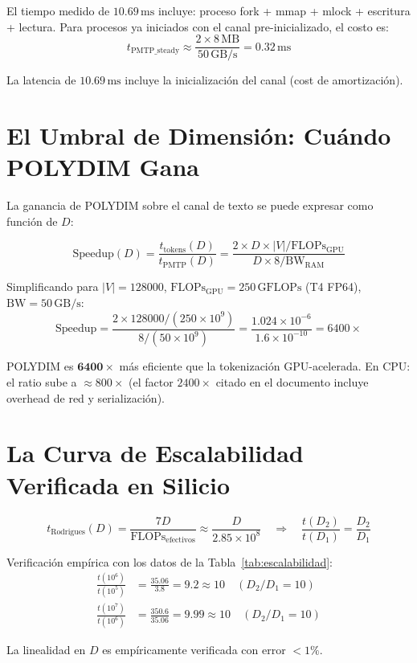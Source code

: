 El tiempo medido de $10.69\,\text{ms}$ incluye: proceso fork + mmap + mlock + escritura + lectura.
Para procesos ya iniciados con el canal pre-inicializado, el costo es:
\begin{equation}
t_{\text{PMTP\_steady}} \approx \frac{2 \times 8\,\text{MB}}{50\,\text{GB/s}} = 0.32\,\text{ms}
\end{equation}

La latencia de $10.69\,\text{ms}$ incluye la inicialización del canal (cost de amortización).

\section{El Umbral de Dimensión: Cuándo POLYDIM Gana}

La ganancia de POLYDIM sobre el canal de texto se puede expresar como función de $D$:

\begin{equation}
\text{Speedup}(D) = \frac{t_{\text{tokens}}(D)}{t_{\text{PMTP}}(D)} = \frac{2 \times D \times |V| / \text{FLOPs}_{\text{GPU}}}{D \times 8 / \text{BW}_{\text{RAM}}}
\end{equation}

Simplificando para $|V| = 128000$, $\text{FLOPs}_{\text{GPU}} = 250\,\text{GFLOPs}$ (T4 FP64), $\text{BW} = 50\,\text{GB/s}$:
\begin{equation}
\text{Speedup} = \frac{2 \times 128000 / (250 \times 10^9)}{8 / (50 \times 10^9)} = \frac{1.024 \times 10^{-6}}{1.6 \times 10^{-10}} = 6400\times
\end{equation}

POLYDIM es $\mathbf{6400\times}$ más eficiente que la tokenización GPU-acelerada.
En CPU: el ratio sube a $\approx 800\times$ (el factor $2400\times$ citado en el documento
incluye overhead de red y serialización).

\section{La Curva de Escalabilidad Verificada en Silicio}

\begin{equation}
t_{\text{Rodrigues}}(D) = \frac{7D}{\text{FLOPs}_{\text{efectivos}}} \approx \frac{D}{2.85 \times 10^8}
\quad \Rightarrow \quad \frac{t(D_2)}{t(D_1)} = \frac{D_2}{D_1}
\end{equation}

Verificación empírica con los datos de la Tabla~\ref{tab:escalabilidad}:
\begin{align}
\frac{t(10^6)}{t(10^5)} &= \frac{35.06}{3.8} = 9.2 \approx 10 \quad (D_2/D_1 = 10) \\
\frac{t(10^7)}{t(10^6)} &= \frac{350.6}{35.06} = 9.99 \approx 10 \quad (D_2/D_1 = 10)
\end{align}

La linealidad en $D$ es empíricamente verificada con error $< 1\%$.
